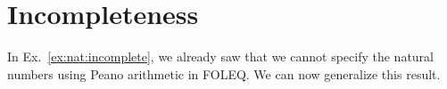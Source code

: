 %
%
%


\section{Incompleteness}\label{sec:fol:incomplete}

In Ex.~\ref{ex:nat:incomplete}, we already saw that we cannot specify the natural numbers using Peano arithmetic in FOLEQ.
We can now generalize this result.

